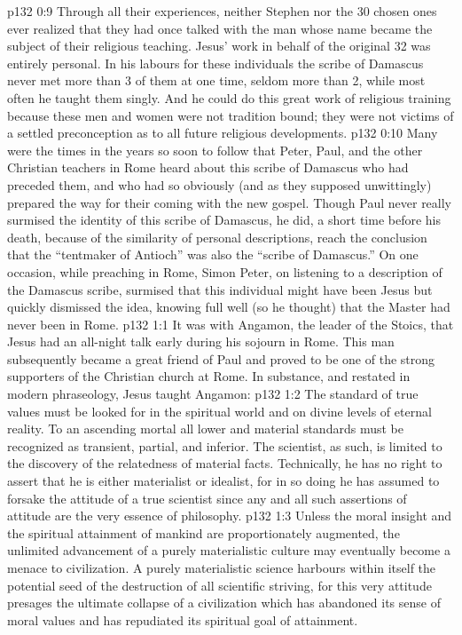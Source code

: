 \vs p132 0:9 \pc Through all their experiences, neither Stephen nor the 30 chosen ones ever realized that they had once talked with the man whose name became the subject of their religious teaching. Jesus’ work in behalf of the original 32 was entirely personal. In his labours for these individuals the scribe of Damascus never met more than 3 of them at one time, seldom more than 2, while most often he taught them singly. And he could do this great work of religious training because these men and women were not tradition bound; they were not victims of a settled preconception as to all future religious developments.
\vs p132 0:10 Many were the times in the years so soon to follow that Peter, Paul, and the other Christian teachers in Rome heard about this scribe of Damascus who had preceded them, and who had so obviously (and as they supposed unwittingly) prepared the way for their coming with the new gospel. Though Paul never really surmised the identity of this scribe of Damascus, he did, a short time before his death, because of the similarity of personal descriptions, reach the conclusion that the “tentmaker of Antioch” was also the “scribe of Damascus.” On one occasion, while preaching in Rome, Simon Peter, on listening to a description of the Damascus scribe, surmised that this individual might have been Jesus but quickly dismissed the idea, knowing full well (so he thought) that the Master had never been in Rome.
\vs p132 1:1 It was with Angamon, the leader of the Stoics, that Jesus had an all\hyp{}night talk early during his sojourn in Rome. This man subsequently became a great friend of Paul and proved to be one of the strong supporters of the Christian church at Rome. In substance, and restated in modern phraseology, Jesus taught Angamon:
\vs p132 1:2 \pc The standard of true values must be looked for in the spiritual world and on divine levels of eternal reality. To an ascending mortal all lower and material standards must be recognized as transient, partial, and inferior. The scientist, as such, is limited to the discovery of the relatedness of material facts. Technically, he has no right to assert that he is either materialist or idealist, for in so doing he has assumed to forsake the attitude of a true scientist since any and all such assertions of attitude are the very essence of philosophy.
\vs p132 1:3 Unless the moral insight and the spiritual attainment of mankind are proportionately augmented, the unlimited advancement of a purely materialistic culture may eventually become a menace to civilization. A purely materialistic science harbours within itself the potential seed of the destruction of all scientific striving, for this very attitude presages the ultimate collapse of a civilization which has abandoned its sense of moral values and has repudiated its spiritual goal of attainment.
